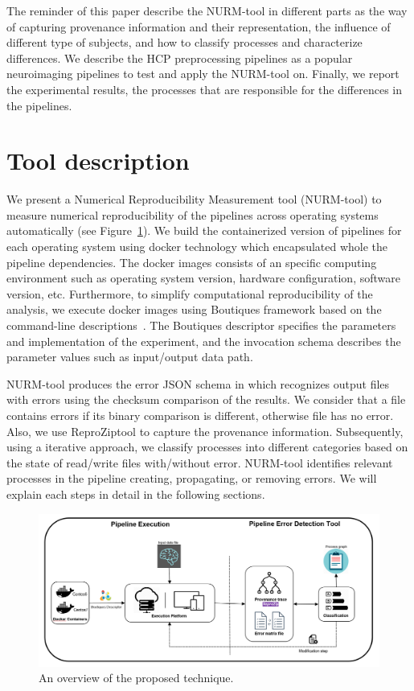\documentclass[a4paper,num-refs]{oup-contemporary}
\newcommand{\reprozip}[0]{ReproZip}
\begin{document}
The reminder of this paper describe the NURM-tool in different parts as 
the way of capturing provenance information and their representation, 
the influence of different type of subjects, and how to classify 
processes and characterize differences. We describe the HCP preprocessing 
pipelines as a popular neuroimaging pipelines to test and apply the 
NURM-tool on. Finally, we report the experimental results, the processes 
that are responsible for the differences in the pipelines.


\section{Tool description}

We present a Numerical Reproducibility Measurement tool (NURM-tool) to 
measure numerical reproducibility of the pipelines across operating 
systems automatically (see Figure~\ref{fig:overview}). We build the 
containerized version of pipelines for each operating system using 
docker technology which encapsulated whole the pipeline dependencies. 
The docker images consists of an specific computing environment such as 
operating system version, hardware configuration, software version, 
etc. Furthermore, to simplify computational reproducibility of the 
analysis, we execute docker images using Boutiques framework based on 
the command-line descriptions~\cite{glatard2017boutiques}. The 
Boutiques descriptor specifies the parameters and implementation of the 
experiment, and the invocation schema describes the parameter values 
such as input/output data path.

NURM-tool produces the error JSON schema in which recognizes output files 
with errors using the checksum comparison of the results. 
We consider that a file contains errors if 
its binary comparison is different, otherwise file has no error. Also, 
we use \reprozip tool to capture the provenance information. 
Subsequently, using a iterative approach, we classify processes into 
different categories based on the state of read/write files 
with/without error. NURM-tool identifies relevant processes in the 
pipeline creating, propagating, or removing errors. We will explain 
each steps in detail in the following sections.

\begin{figure}
\centering
  \includegraphics[width=\columnwidth]{images/overview.png}
  \caption{An overview of the proposed technique.}
  \label{fig:overview}
\end{figure}
\end{document}
